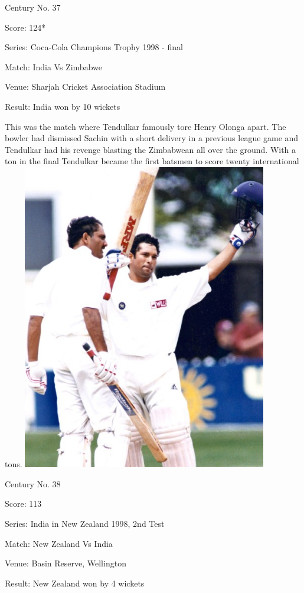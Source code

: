 \documentclass[11pt, a4paper]{article}
\begin{document}
Century No. 37

Score: 124*

Series: Coca-Cola Champions Trophy 1998 - final

Match: India Vs Zimbabwe

Venue: Sharjah Cricket Association Stadium

Result: India won by 10 wickets

This was the match where Tendulkar famously tore Henry Olonga apart. The bowler had dismissed Sachin with a short delivery in a previous league game and Tendulkar had his revenge blasting the Zimbabwean all over the ground. With a ton in the final Tendulkar became the first batsmen to score twenty international tons.
\newpage
\includegraphics[width=0.8\textwidth]{pics/38.jpg}

Century No. 38

Score: 113

Series: India in New Zealand 1998, 2nd Test

Match: New Zealand Vs India

Venue: Basin Reserve, Wellington

Result: New Zealand won by 4 wickets
\end{document}

